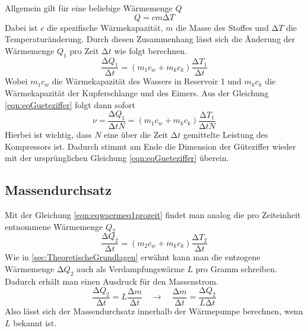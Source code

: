 Allgemein gilt für eine beliebige Wärmemenge $Q$
\begin{equation}
\label{eqn:allgwaerme}
Q = cm \increment T
\end{equation}
Dabei ist $c$ die spezifische Wärmekapazität, $m$ die Masse des Stoffes und $\increment T$ die Temperaturänderung.
Durch diesen Zusammenhang lässt sich die Änderung der Wärmemenge $Q_{1}$ pro Zeit $\increment t$ wie folgt berechnen.
\begin{equation}
\label{eqn:eqwaermeq1prozeit}
\frac{\increment Q_{1}}{\increment t} = (m_{1}c_{w} + m_{k}c_{k})\frac{\increment T_{1}}{\increment t}
\end{equation}
Wobei $m_{1}c_{w}$ die Wärmekapazität des Wassers in Reservoir 1 und $m_{k}c_{k}$ die Wärmekapazität der Kupferschlange und des Eimers.
Aus der Gleichung \eqref{eqn:eqGueteziffer} folgt dann sofort
\begin{equation}
\label{eqn:gueteziffermesswerte}
\nu = \frac{\increment Q_{1}}{\increment t N} = (m_{1}c_{w} + m_{k}c_{k})\frac{\increment T_{1}}{\increment t N}
\end{equation}
Hierbei ist wichtig, dass $N$ eine über die Zeit $\increment t$ gemittelte Leistung des Kompressors ist.
Dadurch stimmt am Ende die Dimension der Güteziffer wieder mit der ursprünglichen Gleichung \eqref{eqn:eqGueteziffer} überein.

\subsection{Massendurchsatz}
\label{sec:massedurchsatz}
Mit der Gleichung \eqref{eqn:eqwaermeq1prozeit} findet man analog die pro Zeiteinheit entnommene Wärmemenge $Q_{2}$
\begin{equation}
\label{eqn:massendurchsatz2}
\frac{\increment Q_{2}}{\increment t} = (m_{2}c_{w} + m_{k}c_{k})\frac{\increment T_{2}}{\increment t}
\end{equation}
Wie in \ref{sec:TheoretischeGrundlagen} erwähnt kann man die entzogene Wärmemenge $\increment Q_{2}$ auch als Verdampfungswärme $L$ pro Gramm schreiben.
Dadurch erhält man einen Ausdruck für den Massenstrom.
\begin{equation}
\label{eqn:eqmassendurchsatz}
\frac{\increment Q_{2}}{\increment t} = L \frac{\increment m}{\increment t} \quad \to \quad \frac{\increment m}{\increment t} = \frac{\increment Q_{2}}{L \increment t}
\end{equation}
Also lässt sich der Massendurchsatz innerhalb der Wärmepumpe berechnen, wenn $L$ bekannt ist.

